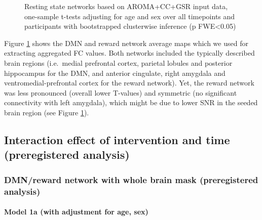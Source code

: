 \documentclass[
]{article}
\begin{document}
\begin{figure}

{\centering {}

}

\caption{Resting state networks based on AROMA+CC+GSR input data, one-sample t-tests adjusting for age and sex over all timepoints and participants with bootstrapped clusterwise inference (p FWE<0.05)}\label{fig:figNetworks}
\end{figure}

Figure \ref{fig:figNetworks} shows the DMN and reward network average maps which we used for extracting aggregated FC values. Both networks included the typically described brain regions (i.e.~medial prefrontal cortex, parietal lobules and posterior hippocampus for the DMN, and anterior cingulate, right amygdala and ventromedial-prefrontal cortex for the reward network).
Yet, the reward network was less pronounced (overall lower T-values) and symmetric (no significant connectivity with left amygdala), which might be due to lower SNR in the seeded brain region (see Figure \ref{fig:figNetworks}).

\hypertarget{interaction-effect-of-intervention-and-time-preregistered-analysis}{%
\subsection{Interaction effect of intervention and time (preregistered analysis)}\label{interaction-effect-of-intervention-and-time-preregistered-analysis}}

\hypertarget{dmnreward-network-with-whole-brain-mask-preregistered-analysis}{%
\subsubsection{DMN/reward network with whole brain mask (preregistered analysis)}\label{dmnreward-network-with-whole-brain-mask-preregistered-analysis}}

\hypertarget{model-1a-with-adjustment-for-age-sex}{%
\paragraph{Model 1a (with adjustment for age, sex)}\label{model-1a-with-adjustment-for-age-sex}}
\end{document}
